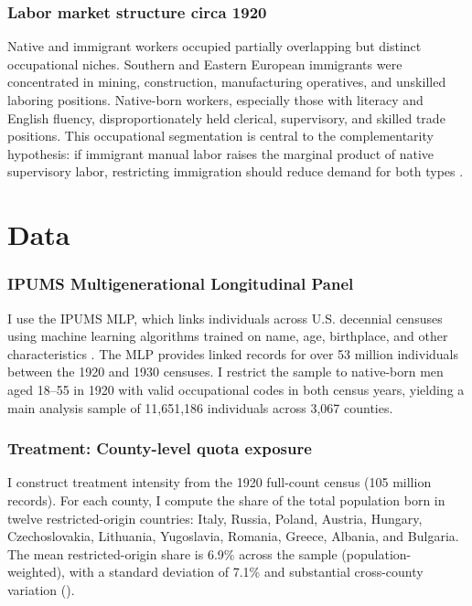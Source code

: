 \documentclass[12pt]{article}
\begin{document}
\subsubsection*{Labor market structure circa 1920} Native and immigrant workers occupied partially overlapping but distinct occupational niches. Southern and Eastern European immigrants were concentrated in mining, construction, manufacturing operatives, and unskilled laboring positions. Native-born workers, especially those with literacy and English fluency, disproportionately held clerical, supervisory, and skilled trade positions. This occupational segmentation is central to the complementarity hypothesis: if immigrant manual labor raises the marginal product of native supervisory labor, restricting immigration should reduce demand for both types \citep{lewis2011}.


\section{Data}
\label{sec:data}

\subsubsection*{IPUMS Multigenerational Longitudinal Panel} I use the IPUMS MLP, which links individuals across U.S. decennial censuses using machine learning algorithms trained on name, age, birthplace, and other characteristics \citep{abramitzky2021, price2020}. The MLP provides linked records for over 53 million individuals between the 1920 and 1930 censuses. I restrict the sample to native-born men aged 18--55 in 1920 with valid occupational codes in both census years, yielding a main analysis sample of 11,651,186 individuals across 3,067 counties.

\subsubsection*{Treatment: County-level quota exposure} I construct treatment intensity from the 1920 full-count census (105 million records). For each county, I compute the share of the total population born in twelve restricted-origin countries: Italy, Russia, Poland, Austria, Hungary, Czechoslovakia, Lithuania, Yugoslavia, Romania, Greece, Albania, and Bulgaria. The mean restricted-origin share is 6.9\% across the sample (population-weighted), with a standard deviation of 7.1\% and substantial cross-county variation ().
\end{document}

